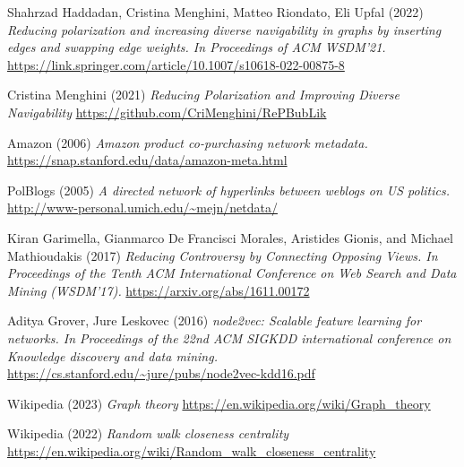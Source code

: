 
\begin{thebibliography}{9}
    Shahrzad Haddadan, Cristina Menghini, Matteo Riondato, Eli Upfal (2022) \emph{Reducing polarization and increasing diverse navigability in graphs by inserting edges and swapping edge weights. In Proceedings of ACM WSDM'21.}
    \href{https://link.springer.com/article/10.1007/s10618-022-00875-8}{\url{https://link.springer.com/article/10.1007/s10618-022-00875-8}}
    
    Cristina Menghini (2021) \emph{Reducing Polarization and Improving Diverse Navigability}
     \href{https://github.com/CriMenghini/RePBubLik}{\url{https://github.com/CriMenghini/RePBubLik}}
    
    Amazon (2006) \emph{Amazon product co-purchasing network metadata.}
    \href{https://snap.stanford.edu/data/amazon-meta.html}{\url{https://snap.stanford.edu/data/amazon-meta.html}}
    
    PolBlogs (2005) \emph{A directed network of hyperlinks between weblogs on US politics.}
    \href{http://www-personal.umich.edu/~mejn/netdata/}{\url{http://www-personal.umich.edu/~mejn/netdata/}} 
    
    Kiran Garimella, Gianmarco De Francisci Morales, Aristides Gionis, and Michael Mathioudakis (2017) \emph{Reducing Controversy by Connecting Opposing Views. In Proceedings of the Tenth ACM International Conference on Web Search and Data Mining (WSDM'17).}
    \href{https://arxiv.org/abs/1611.00172}{\url{https://arxiv.org/abs/1611.00172}}

    Aditya Grover, Jure Leskovec (2016) \emph{node2vec: Scalable feature learning for networks. In Proceedings of the 22nd ACM SIGKDD international conference on Knowledge discovery and data mining.}
    \href{https://cs.stanford.edu/~jure/pubs/node2vec-kdd16.pdf}{\url{https://cs.stanford.edu/~jure/pubs/node2vec-kdd16.pdf}}
    
    Wikipedia (2023) \emph{Graph theory}
    \href{https://en.wikipedia.org/wiki/Graph_theory}{\url{https://en.wikipedia.org/wiki/Graph_theory}}

    Wikipedia (2022) \emph{Random walk closeness centrality}
    \href{https://en.wikipedia.org/wiki/Random_walk_closeness_centrality}{\url{https://en.wikipedia.org/wiki/Random_walk_closeness_centrality}}
\end{thebibliography}

